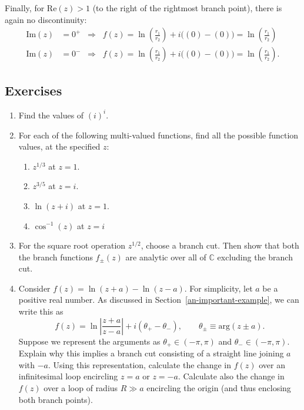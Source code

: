 \documentclass[10pt,a4paper]{article}
\begin{document}
Finally, for $\mathrm{Re}(z) > 1$ (to the right of the rightmost
branch point), there is again no discontinuity:
\begin{align}
  \mathrm{Im}(z) &= 0^+ \;\;\Rightarrow\;\; f(z) = \ln\left(\frac{r_1}{r_2}\right) + i\Big((0) - (0)\Big) = \ln\left(\frac{r_1}{r_2}\right) \\ \mathrm{Im}(z) &= 0^- \;\;\Rightarrow\;\; f(z) = \ln\left(\frac{r_1}{r_2}\right) + i\Big((0) - (0)\Big) = \ln\left(\frac{r_1}{r_2}\right).
\end{align}

\subsection{Exercises}\label{exercises}

\begin{enumerate}
\item
Find the values of $(i)^i$.

\item For each of the following multi-valued functions, find all the possible
function values, at the specified $z$:
\begin{enumerate}
\item $z^{1/3}$ at $z = 1$.

\item $z^{3/5}$ at $z = i$.

\item $\ln(z+i)$ at $z = 1$.

\item $\cos^{-1}(z)$ at $z = i$
\end{enumerate}

\item
For the square root operation $z^{1/2}$, choose a branch cut. Then
show that both the branch functions $f_\pm(z)$ are analytic over all
of $\mathbb{C}$ excluding the branch cut.

\item
  Consider $f(z) = \ln(z+a) - \ln(z-a)$. For simplicity, let $a$ be a
  positive real number. As discussed in
  Section~\ref{an-important-example}, we can write this as
\begin{equation}
f(z) = \ln\left|\frac{z+a}{z-a}\right| + i(\theta_+ - \theta_-), \qquad \theta_\pm \equiv \mathrm{arg}(z\pm a).
\end{equation}
Suppose we represent the arguments as $\theta_+ \in (-\pi,\pi)$ and
$\theta_- \in (-\pi,\pi)$. Explain why this implies a branch cut
consisting of a straight line joining $a$ with $-a$. Using this
representation, calculate the change in $f(z)$ over an infinitesimal
loop encircling $z = a$ or $z = -a$. Calculate also the change in
$f(z)$ over a loop of radius $R \gg a$ encircling the origin (and
thus enclosing both branch points).
\end{enumerate}
\end{document}
